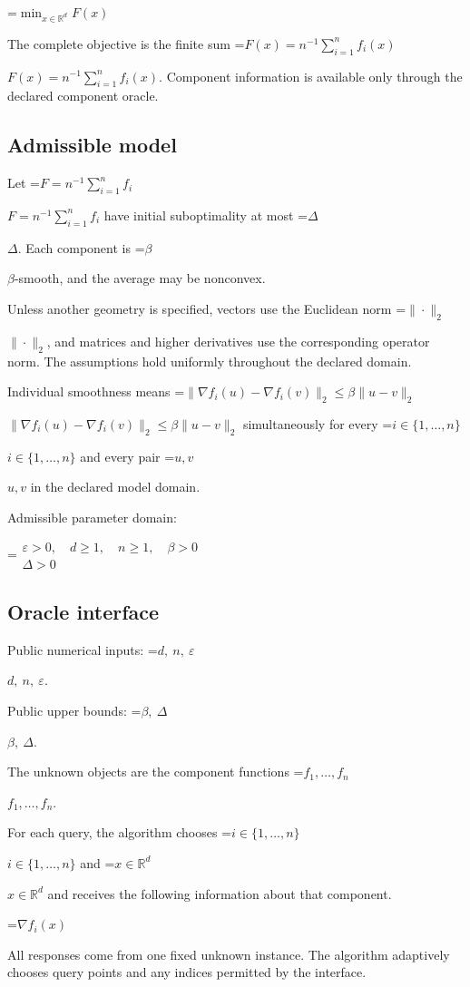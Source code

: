\documentclass[10pt,a4paper]{article}
\newcommand{\AtlasMath}[1]{\par\begingroup\centering\setbox0=\hbox{$\displaystyle #1$}\ifdim\wd0>1.4\linewidth\typeout{ATLAS WIDE FORMULA: \the\wd0}\fi\ifdim\wd0>\linewidth\resizebox{\linewidth}{!}{\box0}\else\box0\fi\par\endgroup}
\newcommand{\AtlasInlineMath}[1]{\begingroup\setbox0=\hbox{$#1$}\ifdim\wd0>.4\linewidth\endgroup\AtlasMath{#1}\else\endgroup$#1$\fi}
\begin{document}
\AtlasMath{\min_{x\in \mathbb{R}^d}F(x)}


The complete objective is the finite sum \AtlasInlineMath{F(x)=n^{-1}\sum_{i=1}^n f_i(x)}. Component information is available only through the declared component oracle.

\subsection{Admissible model}
Let \AtlasInlineMath{F=n^{-1}\sum_{i=1}^n f_i} have initial suboptimality at most \AtlasInlineMath{\Delta}. Each component is \AtlasInlineMath{\beta}-smooth, and the average may be nonconvex.

Unless another geometry is specified, vectors use the Euclidean norm \AtlasInlineMath{\|\cdot\|_2}, and matrices and higher derivatives use the corresponding operator norm. The assumptions hold uniformly throughout the declared domain.

Individual smoothness means \AtlasInlineMath{\|\nabla f_i(u)-\nabla f_i(v)\|_2\le\beta\|u-v\|_2} simultaneously for every \AtlasInlineMath{i\in\{1,\ldots,n\}} and every pair \AtlasInlineMath{u,v} in the declared model domain.

Admissible parameter domain:


\AtlasMath{\begin{gathered}\varepsilon > 0,\quad d \ge 1,\quad n \ge 1,\quad \beta > 0\\\Delta > 0\end{gathered}}


\subsection{Oracle interface}
Public numerical inputs: \AtlasInlineMath{d,\ n,\ \varepsilon}.

Public upper bounds: \AtlasInlineMath{\beta,\ \Delta}.

The unknown objects are the component functions \AtlasInlineMath{f_1,\ldots,f_n}.

For each query, the algorithm chooses \AtlasInlineMath{i\in\{1,\ldots,n\}} and \AtlasInlineMath{x\in\mathbb R^d} and receives the following information about that component.


\AtlasMath{\nabla f_i(x)}


All responses come from one fixed unknown instance. The algorithm adaptively chooses query points and any indices permitted by the interface.
\end{document}
